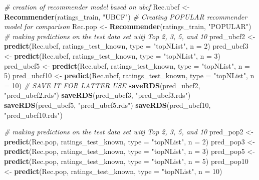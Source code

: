 \documentclass[]{article}
\newenvironment{Shaded}{\begin{snugshade}}{\end{snugshade}}
\newcommand{\CommentTok}[1]{\textcolor[rgb]{0.56,0.35,0.01}{\textit{#1}}}
\newcommand{\DataTypeTok}[1]{\textcolor[rgb]{0.13,0.29,0.53}{#1}}
\newcommand{\DecValTok}[1]{\textcolor[rgb]{0.00,0.00,0.81}{#1}}
\newcommand{\KeywordTok}[1]{\textcolor[rgb]{0.13,0.29,0.53}{\textbf{#1}}}
\newcommand{\NormalTok}[1]{#1}
\newcommand{\StringTok}[1]{\textcolor[rgb]{0.31,0.60,0.02}{#1}}
\begin{document}
\begin{Shaded}
\begin{Highlighting}[]
\CommentTok{# creation of recommender model based on ubcf}
\NormalTok{Rec.ubcf <-}\StringTok{ }\KeywordTok{Recommender}\NormalTok{(ratings_train, }\StringTok{"UBCF"}\NormalTok{)}
\CommentTok{# Creating POPULAR recommender model for comparison}
\NormalTok{Rec.pop <-}\StringTok{ }\KeywordTok{Recommender}\NormalTok{(ratings_train, }\StringTok{"POPULAR"}\NormalTok{)}
\CommentTok{# making predictions on the test data set witj Top 2, 3, 5, and 10}
\NormalTok{pred_ubcf2 <-}\StringTok{ }\KeywordTok{predict}\NormalTok{(Rec.ubcf, ratings_test_known, }\DataTypeTok{type =} \StringTok{"topNList"}\NormalTok{, }\DataTypeTok{n =} \DecValTok{2}\NormalTok{)}
\NormalTok{pred_ubcf3 <-}\StringTok{ }\KeywordTok{predict}\NormalTok{(Rec.ubcf, ratings_test_known, }\DataTypeTok{type =} \StringTok{"topNList"}\NormalTok{, }\DataTypeTok{n =} \DecValTok{3}\NormalTok{)}
\NormalTok{pred_ubcf5 <-}\StringTok{ }\KeywordTok{predict}\NormalTok{(Rec.ubcf, ratings_test_known, }\DataTypeTok{type =} \StringTok{"topNList"}\NormalTok{, }\DataTypeTok{n =} \DecValTok{5}\NormalTok{)}
\NormalTok{pred_ubcf10 <-}\StringTok{ }\KeywordTok{predict}\NormalTok{(Rec.ubcf, ratings_test_known, }\DataTypeTok{type =} \StringTok{"topNList"}\NormalTok{, }\DataTypeTok{n =} \DecValTok{10}\NormalTok{)}
\CommentTok{# SAVE IT FOR LATTER USE}
\KeywordTok{saveRDS}\NormalTok{(pred_ubcf2, }\StringTok{"pred_ubcf2.rds"}\NormalTok{)}
\KeywordTok{saveRDS}\NormalTok{(pred_ubcf3, }\StringTok{"pred_ubcf3.rds"}\NormalTok{)}
\KeywordTok{saveRDS}\NormalTok{(pred_ubcf5, }\StringTok{"pred_ubcf5.rds"}\NormalTok{)}
\KeywordTok{saveRDS}\NormalTok{(pred_ubcf10, }\StringTok{"pred_ubcf10.rds"}\NormalTok{)}

\CommentTok{# making predictions on the test data set witj Top 2, 3, 5, and 10}
\NormalTok{pred_pop2 <-}\StringTok{ }\KeywordTok{predict}\NormalTok{(Rec.pop, ratings_test_known, }\DataTypeTok{type =} \StringTok{"topNList"}\NormalTok{, }\DataTypeTok{n =} \DecValTok{2}\NormalTok{)}
\NormalTok{pred_pop3 <-}\StringTok{ }\KeywordTok{predict}\NormalTok{(Rec.pop, ratings_test_known, }\DataTypeTok{type =} \StringTok{"topNList"}\NormalTok{, }\DataTypeTok{n =} \DecValTok{3}\NormalTok{)}
\NormalTok{pred_pop5 <-}\StringTok{ }\KeywordTok{predict}\NormalTok{(Rec.pop, ratings_test_known, }\DataTypeTok{type =} \StringTok{"topNList"}\NormalTok{, }\DataTypeTok{n =} \DecValTok{5}\NormalTok{)}
\NormalTok{pred_pop10 <-}\StringTok{ }\KeywordTok{predict}\NormalTok{(Rec.pop, ratings_test_known, }\DataTypeTok{type =} \StringTok{"topNList"}\NormalTok{, }\DataTypeTok{n =} \DecValTok{10}\NormalTok{)}


\end{Highlighting}
\end{Shaded}
\end{document}
